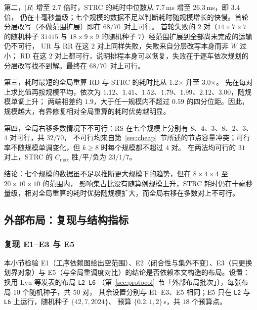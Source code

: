 \documentclass[manuscript,screen,review]{acmart}
\providecommand{\STRC}{\textsc{STRC}}
\newcommand{\NSeeds}{10}
\newcommand{\NPubPairs}{50}
\newcommand{\ScalePairs}{70}
\newcommand{\ScaleJobsHi}{20}
\newcommand{\ScaleMachHi}{10}
\newcommand{\ScaleMsHi}{26.3}  %
\newcommand{\ScaleRatioLo}{1.2}  %
\newcommand{\ScaleRatioHi}{3.0}  %
\newcommand{\ScaleFeasFirst}{68/\ScalePairs}   %
\newcommand{\ScaleFeasAll}{68/\ScalePairs}     %
\begin{document}
第二，\(|R|\) 增至 \(2.7\) 倍时，\STRC{} 的耗时中位数从 \(7.7\)\,ms 增至 \ScaleMsHi\,ms，即 \(3.4\) 倍，
仍在十毫秒量级；七个规模的数据不足以判断耗时随规模增长的快慢。首轮分层改写（不做范围扩展）即在 \ScaleFeasFirst\ 对上可行。
首轮失败的 \(2\) 对（\(14\times7\times7\) 的随机种子 \(31415\) 与 \(18\times9\times9\) 的随机种子 \(7\)）经范围扩展到全部尚未完成的运输仍不可行，
UR 与 RR 在这 \(2\) 对上同样失败，失败来自分层改写本身而非 \(W\) 过小；
RD 在这 \(2\) 对上都可行，说明排程本身可以恢复，失败在于逐车依次规划的分层改写找不到解。最终在 \ScaleFeasAll\ 对上可行。

第三，耗时最短的全局重算 RD 与 \STRC{} 的耗时比从 \ScaleRatioLo\(\times\) 升至 \ScaleRatioHi\(\times\)。
先在每对上求比值再按规模平均，依次为 \(1.12\)、\(1.41\)、\(1.52\)、\(1.79\)、\(1.99\)、\(2.12\)、\(3.00\)，随规模单调上升；
两端相差约 \(1.9\)，大于任一规模内不超过 \(0.59\) 的四分位距。因此，规模越大，有界修复相对全局重算的耗时优势越明显。

第四，全局右移多数情况下不可行：RS 在七个规模上分别有 \(8\)、\(4\)、\(3\)、\(8\)、\(2\)、\(3\)、\(4\) 对可行，共 \(32/\ScalePairs\)，
不可行均来自第~\ref{sec:cheap}~节所述的节点容量冲突；可行率不随规模单调变化，但 \(k\ge8\) 时每个规模都不超过 \(4\) 对。
在两法均可行的 \(31\) 对上，\STRC{} 的 \(C_{\max}\) 胜/平/负为 \(23/1/7\)。

结论：七个规模的数据虽不足以推断更大规模下的趋势，但在 \(8\times4\times4\) 至 \(\ScaleJobsHi\times\ScaleMachHi\times\ScaleMachHi\) 的范围内，
影响集占比没有随算例规模上升，\STRC{} 耗时仍在十毫秒量级，相对全局重算的耗时优势随规模扩大，而全局右移在多数对上不可行。

\subsection{外部布局：复现与结构指标}
\label{sec:pub}

\subsubsection{复现 E1--E3 与 E5}
\label{sec:pubrepro}

本小节检验 E1（工序依赖图给出空范围）、E2（闭合性与集外不变）、E3（只更换划界对象）与 E5（与全局重调度对比）的结论是否依赖本文构造的布局。设置：换用 Lyu 等发表的布局 \texttt{L2}--\texttt{L6}
（第~\ref{sec:protocol}~节「外部布局批次」），每张布局 \(\NSeeds\) 个随机种子，共 \(\NPubPairs\) 对，
其余设置分别与 E1--E3、E5 相同；E5 只在 \texttt{L2} 与 \texttt{L6} 上运行，随机种子 \(\{42,7,2024\}\)、
预算 \(\{0.2,1,2\}\)\,s，共 \(18\) 个预算点。
\end{document}

